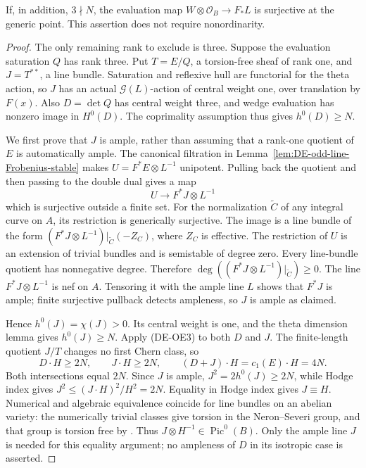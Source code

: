 \begin{proposition}
\label{prop:DE-prime-to-six-evaluation-four}
If, in addition, \(3\nmid N\), the evaluation map
\(W\otimes\mathcal O_B\to F_*L\) is surjective at the
generic point. This assertion does not require nonordinarity.
\end{proposition}
\begin{proof}
The only remaining rank to exclude is three. Suppose the
evaluation saturation \(Q\) has rank three. Put
\(T=E/Q\), a torsion-free sheaf of rank one, and
\(J=T^{**}\), a line bundle. Saturation and reflexive hull
are functorial for the theta action, so \(J\) has an actual
\(\mathcal G(L)\)-action of central weight one, over translation
by \(F(x)\). Also \(D=\det Q\) has central weight three,
and wedge evaluation has nonzero image in \(H^0(D)\).
The coprimality assumption thus gives \(h^0(D)\ge N\).

We first prove that \(J\) is ample, rather than assuming
that a rank-one quotient of \(E\) is automatically ample.
The canonical filtration in
Lemma~\ref{lem:DE-odd-line-Frobenius-stable} makes
\(U=F^*E\otimes L^{-1}\) unipotent. Pulling back the quotient
and then passing to the double dual gives a map
\[
                   U\longrightarrow F^*J\otimes L^{-1}
 \tag{DE-OE7}
\]
which is surjective outside a finite set. For the normalization
\(\widetilde C\) of any integral curve on \(A\), its restriction
is generically surjective. The image is a line bundle of the form
\((F^*J\otimes L^{-1})|_{\widetilde C}(-Z_C)\),
where \(Z_C\) is effective. The restriction of \(U\) is an
extension of trivial bundles and is semistable of degree zero.
Every line-bundle quotient has nonnegative degree. Therefore
\(\deg((F^*J\otimes L^{-1})|_{\widetilde C})\ge0\).
The line \(F^*J\otimes L^{-1}\) is nef on \(A\).
Tensoring it with the ample line \(L\) shows that \(F^*J\)
is ample; finite surjective pullback detects ampleness, so \(J\)
is ample as claimed.

Hence \(h^0(J)=\chi(J)>0\). Its central weight is one, and
the theta dimension lemma gives \(h^0(J)\ge N\).
Apply (DE-OE3) to both \(D\) and \(J\). The finite-length
quotient \(J/T\) changes no first Chern class, so
\[
  D\cdot H\ge2N,\qquad J\cdot H\ge2N,\qquad
  (D+J)\cdot H=c_1(E)\cdot H=4N.
 \tag{DE-OE8}
\]
Both intersections equal \(2N\). Since \(J\) is ample,
\(J^2=2h^0(J)\ge2N\), while Hodge index gives
\(J^2\le(J\cdot H)^2/H^2=2N\). Equality in Hodge index
gives \(J\equiv H\). Numerical and algebraic equivalence
coincide for line bundles on an abelian variety: the numerically
trivial classes give torsion in the Neron--Severi group, and
that group is torsion free by
\citep[Corollaries~7.23 and~7.25, pp.~106--107]
{EdixhovenVanDerGeerMoonenAV}. Thus
\(J\otimes H^{-1}\in\operatorname{Pic}^0(B)\).
Only the ample line \(J\) is needed for this equality argument;
no ampleness of \(D\) in its isotropic case is asserted.


\end{proof}
